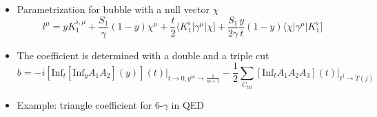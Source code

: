 \documentclass[english]{beamer}
\newcommand{\Inf}{\mathrm{Inf}}
\begin{document}
\begin{frame}[shrink=20]
\begin{itemize}
\item<3-> Parametrization for bubble with a null vector $\chi$
\small
\begin{equation*}
l^\mu = yK_1^{\flat,\mu} + \frac{S_1}{\gamma}(1-y)\chi^\mu + \frac{t}{2}\langle K_1^\flat|\gamma^\mu|\chi] + \frac{S_1}{2\gamma}\frac{y}{t}(1-y)\langle \chi|\gamma^\mu|K_1^\flat]
\end{equation*}
\normalsize
\item<4->[]
The coefficient is determined with a double and a triple cut
\begin{equation*}
b = -i[\Inf_t[\Inf_y A_1 A_2](y)](t)\big|_{t\rightarrow 0 , y^m\rightarrow \frac{1}{m+1}}
-\frac{1}{2}\sum_{C_{\mathrm{tri}}}[\Inf_t A_1A_2A_3](t)\big|_{t^j\rightarrow T(j)}
\end{equation*} 

\item<5-> Example: triangle coefficient for 6-$\gamma$ in QED

\end{itemize}

\end{frame}
\end{document}
